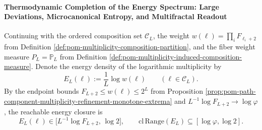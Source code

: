 \paragraph{Thermodynamic Completion of the Energy Spectrum: Large Deviations, Microcanonical Entropy, and Multifractal Readout}\label{par:pom-multiplicity-energy-ldp-multifractal}
Continuing with the ordered composition set \(\mathcal{C}_L\), the weight
\(
w(\boldsymbol{\ell})=\prod_i F_{\ell_i+2}
\)
from Definition \ref{def:pom-multiplicity-composition-partition}, and the fiber weight measure
\(
P_L=\mathbb{P}_L
\)
from Definition \ref{def:pom-multiplicity-induced-composition-measure}.
Denote the energy density of the logarithmic multiplicity by
\[
E_L(\boldsymbol{\ell}):=\frac{1}{L}\log w(\boldsymbol{\ell})
\qquad(\boldsymbol{\ell}\in\mathcal{C}_L).
\]
By the endpoint bounds \(F_{L+2}\le w(\boldsymbol{\ell})\le 2^L\) from Proposition \ref{prop:pom-path-component-multiplicity-refinement-monotone-extrema} and \(L^{-1}\log F_{L+2}\to\log\varphi\), the reachable energy closure is
\[
E_L(\boldsymbol{\ell})\in\bigl[L^{-1}\log F_{L+2},\,\log 2\bigr],
\qquad
\mathrm{cl}\,\mathrm{Range}(E_L)\subseteq[\log\varphi,\log 2].
\]

